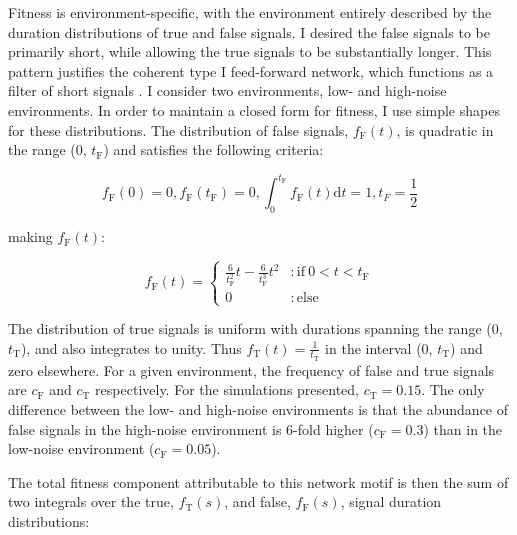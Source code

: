 \documentclass[dvips,12pt,twoside,titlepage]{article}
\newcommand{\ud}{\mathrm{d}}
\begin{document}
Fitness is environment-specific, with the environment entirely described by the duration distributions of true and false signals. 
I desired the false signals to be primarily short, while allowing the true signals to be substantially longer. This pattern justifies the coherent type I feed-forward network, which functions as a filter of short signals \cite{Alon:2006tm}.
I consider two environments, low- and high-noise environments.
In order to maintain a closed form for fitness, I use simple shapes for these distributions. 
The distribution of false signals, $f_{\mathrm{F}}(t)$, is quadratic in the range (0, $t_{\mathrm{F}}$) and satisfies the following criteria: 

\begin{displaymath}
f_{\mathrm{F}}(0) = 0, f_{\mathrm{F}}(t_{\mathrm{F}}) = 0, \int_0^{t_{\mathrm{F}}}f_{\mathrm{F}}(t)\ud t = 1, \textstyle t_F = \frac{1}{2}
\end{displaymath}

\vspace{0.6cm}

\noindent making $f_{\mathrm{F}}(t)$:

\begin{displaymath}
f_{\mathrm{F}}(t) = 
\begin{cases}
   \frac{6}{t_{\mathrm{F}}^2} t - \frac{6}{t_{\mathrm{F}}^3}t^2 & : \mathrm{if}\ 0 < t < t_{\mathrm{F}} \\
   0 & : \mathrm{else}
\end{cases}
\end{displaymath}

\vspace{0.6cm}

The distribution of true signals is uniform with durations spanning the range (0, $t_{\mathrm{T}}$), and also integrates to unity. Thus $f_{\mathrm{T}}(t) = \frac{1}{t_{\mathrm{T}}}$ in the interval (0, $t_{\mathrm{T}}$) and zero elsewhere. 
For a given environment, the frequency of false and true signals are $c_{\mathrm{F}}$ and $c_{\mathrm{T}}$ respectively. 
For the simulations presented, $c_{\mathrm{T}} = 0.15$.
The only difference between the low- and high-noise environments is that the abundance of false signals in the high-noise environment is $6$-fold higher ($c_{\mathrm{F}} = 0.3$) than in the low-noise environment ($c_{\mathrm{F}} = 0.05$).

The total fitness component attributable to this network motif is then the sum of two integrals over the true, $f_{\mathrm{T}}(s)$, and false, $f_{\mathrm{F}}(s)$, signal duration distributions: 
\end{document}
